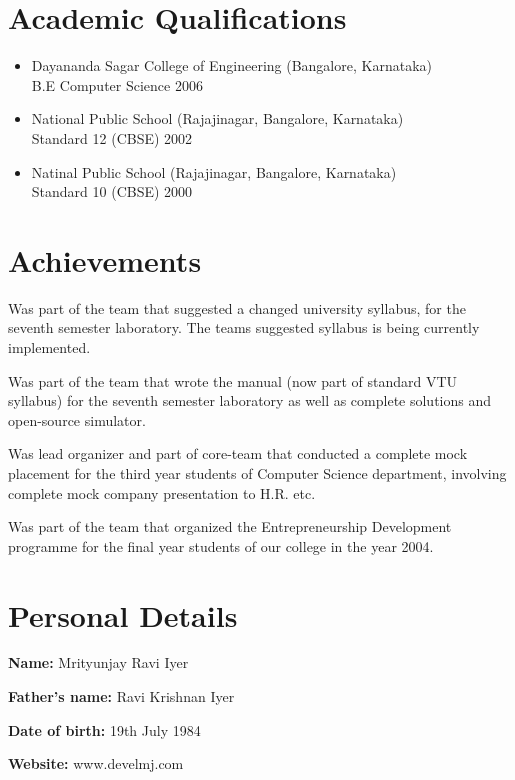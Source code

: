\documentclass[a4paper,11pt]{article}
\begin{document}
\section{Academic Qualifications}

\begin{itemize}
  \item[\footnotesize$\bullet$] Dayananda Sagar College of Engineering (Bangalore,
  Karnataka)\\ B.E Computer Science \hfill 2006
  \item[\footnotesize$\bullet$] National Public School (Rajajinagar, Bangalore,
  Karnataka)\\ Standard 12 (CBSE) \hfill 2002
  \item[\footnotesize$\bullet$] Natinal Public School (Rajajinagar, Bangalore,
  Karnataka)\\ Standard 10 (CBSE) \hfill 2000
\end{itemize}

\section{Achievements}

\begin{itemize}
\footnotesize{
  \item[\footnotesize$\bullet$] Was part of the team that suggested a changed university syllabus, for the seventh semester laboratory. The teams suggested syllabus is being currently implemented.
  \item[\footnotesize$\bullet$] Was part of the team that wrote the manual (now part of
  standard VTU syllabus) for the seventh
  semester laboratory as well as complete solutions and open-source
  simulator.
  \item[\footnotesize$\bullet$] Was lead organizer and part of core-team that conducted a complete mock placement for the third year students of Computer Science department, involving complete mock company presentation to H.R. etc.
  \item[\footnotesize$\bullet$] Was part of the team that organized
    the Entrepreneurship Development programme for the final year
    students of our college in the year 2004.
}
\end{itemize}

\section{Personal Details}
\begin{itemize}
\footnotesize{
  \item[\footnotesize$\bullet$] \textbf{Name:} Mrityunjay Ravi Iyer
  \item[\footnotesize$\bullet$] \textbf{Father's name:} Ravi Krishnan Iyer
  \item[\footnotesize$\bullet$] \textbf{Date of birth:} 19th July 1984
  \item[\footnotesize$\bullet$] \textbf{Website:} www.develmj.com
}
\end{itemize}
\end{document}
